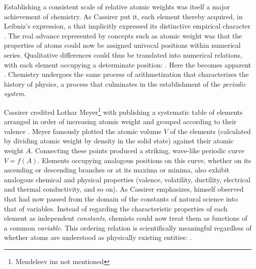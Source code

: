\documentclass[submitted,12pt]{article}
\begin{document}
Establishing a consistent scale of relative atomic weights was itself a major achievement of chemistry. As Cassirer put it, each element thereby acquired, in Leibniz’s expression, a  that implicitly expressed its distinctive empirical character . The real advance represented by concepts such as atomic weight was that the properties of atoms could now be assigned univocal positions within numerical series. Qualitative differences could thus be translated into numerical relations, with each element occupying a determinate position:  . Here the   becomes apparent . Chemistry undergoes the same process of arithmetization that characterizes the history of physics, a process that culminates in the establishment of the \emph{periodic system}.



Cassirer credited Lothar Meyer\footnote{Mendeleev ins not mentioned} with publishing a systematic table of elements arranged in order of increasing atomic weight and grouped according to their valence \citep[see][e.g.]{Arnesano2025}. Meyer famously plotted the atomic volume $V$ of the elements (calculated by dividing atomic weight by density in the solid state) against their atomic weight $A$. Connecting these points produced a striking, wave-like periodic curve $V=f(A)$. Elements occupying analogous positions on this curve, whether on its ascending or descending branches or at its maxima or minima, also exhibit analogous chemical and physical properties (valence, volatility, ductility, electrical and thermal conductivity, and so on). As Cassirer emphasizes, \citet[176]{Meyer1884} himself observed that  had now passed from the domain of the constants of natural science into that of variables. Instead of regarding the characteristic properties of each element as independent \emph{constants}, chemists could now treat them as functions of a common \emph{variable}. This ordering relation is scientifically meaningful regardless of whether atoms are understood as physically existing entities:  .
\end{document}
